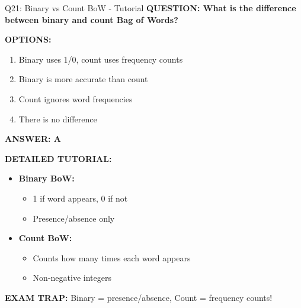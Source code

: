 \documentclass[8pt]{beamer}
\begin{document}
	\begin{frame}{Q21: Binary vs Count BoW - Tutorial}
		\fontsize{6.5}{7.5}\selectfont
		\textbf{QUESTION: What is the difference between binary and count Bag of Words?}
		
		\vspace{0.1cm}
		\textbf{OPTIONS:}
		\begin{enumerate}
			\item Binary uses 1/0, count uses frequency counts
			\item Binary is more accurate than count
			\item Count ignores word frequencies
			\item There is no difference
		\end{enumerate}
		
		\vspace{0.1cm}
		\textcolor{myblue}{\textbf{ANSWER: A}}
		
		\vspace{0.1cm}
		\textbf{DETAILED TUTORIAL:}
		\begin{itemize}
			\item \textbf{Binary BoW:}
			\begin{itemize}
				\item 1 if word appears, 0 if not
				\item Presence/absence only
			\end{itemize}
			\item \textbf{Count BoW:}
			\begin{itemize}
				\item Counts how many times each word appears
				\item Non-negative integers
			\end{itemize}
		\end{itemize}
		
		\textcolor{myred}{\textbf{EXAM TRAP:}} Binary = \textcolor{myblue}{presence/absence}, Count = \textcolor{myblue}{frequency counts}!
	\end{frame}
	
\end{document}
